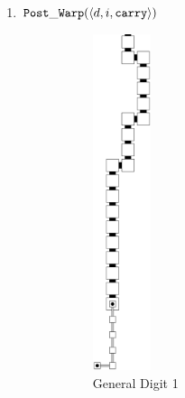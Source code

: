 \begin{enumerate}[label={--}]
            \item ${\tt Post\_Warp}  (\langle d, i, {\tt carry}\rangle)$
                \begin{figure}[H]
                    \begin{subfigure}[t]{0.2\textwidth}
                        \centering
                        \includegraphics[width=0.2\textwidth]{warping/post_warp_general_digit1}
                        \caption{\label{fig:warping/post_warp_general_digit1} General Digit 1}
                    \end{subfigure}%
                    ~
                    \begin{subfigure}[t]{0.2\textwidth}
                        \centering

\end{subfigure}
\end{figure}
\end{enumerate}
